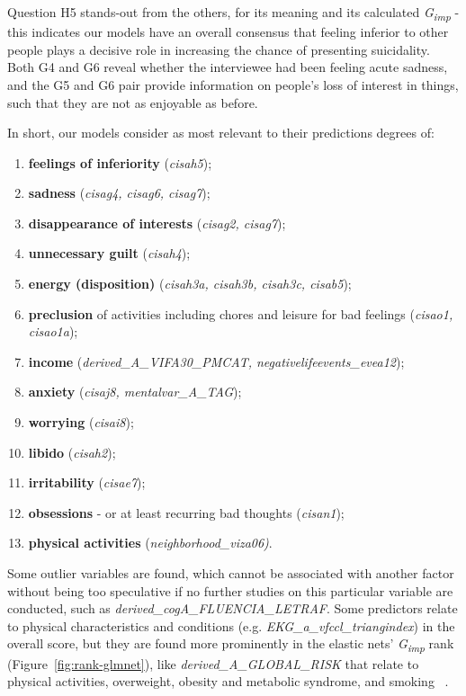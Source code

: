 \pagebreak

Question H5 stands-out from the others, for its meaning and its calculated \textit{G\textsubscript{imp}} - this indicates our models have an overall consensus that feeling inferior to other people plays a decisive role in increasing the chance of presenting suicidality.
Both G4 and G6 reveal whether the interviewee had been feeling acute sadness, and the G5 and G6 pair provide information on people's loss of interest in things, such that they are not as enjoyable as before.

In short, our models consider as most relevant to their predictions degrees of:
\begin{enumerate}
    \item \textbf{feelings of inferiority} (\textit{cisah5});
    \item \textbf{sadness} (\textit{cisag4, cisag6, cisag7});
    \item \textbf{disappearance of interests} (\textit{cisag2, cisag7});
    \item \textbf{unnecessary guilt} (\textit{cisah4});
    \item \textbf{energy (disposition)} (\textit{cisah3a, cisah3b, cisah3c, cisab5});
    \item \textbf{preclusion} of activities including chores and leisure for bad feelings (\textit{cisao1, cisao1a});
    \item \textbf{income} (\textit{derived\_A\_VIFA30\_PMCAT, negativelifeevents\_evea12});
    \item \textbf{anxiety} (\textit{cisaj8, mentalvar\_A\_TAG});
    \item \textbf{worrying} (\textit{cisai8});
    \item \textbf{libido} (\textit{cisah2});
    \item \textbf{irritability} (\textit{cisae7});
    \item \textbf{obsessions} - or at least recurring bad thoughts (\textit{cisan1});
    \item \textbf{physical activities} (\textit{neighborhood\_viza06)}.
\end{enumerate}

Some outlier variables are found, which cannot be associated with another factor without being too speculative if no further studies on this particular variable are conducted, such as \textit{derived\_cogA\_FLUENCIA\_LETRAF}.
Some predictors relate to physical characteristics and conditions (e.g. \textit{EKG\_a\_vfccl\_triangindex}) in the overall score, but they are found more prominently in the elastic nets' \textit{G\textsubscript{imp}} rank (Figure~\ref{fig:rank-glmnet}), like \textit{derived\_A\_GLOBAL\_RISK} that relate to physical activities, overweight, obesity and metabolic syndrome, and smoking ~\cite{Coke2010}.
